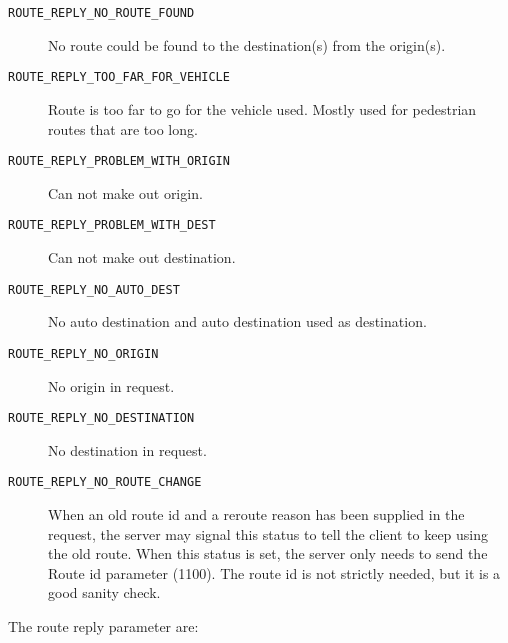 \documentclass[a4paper]{article}
\begin{document}
\begin{description}
   \item[{\tt ROUTE\_REPLY\_NO\_ROUTE\_FOUND}] No route could be found to the 
      destination(s) from the origin(s).
   \item[{\tt ROUTE\_REPLY\_TOO\_FAR\_FOR\_VEHICLE}] Route is too far to go
      for the vehicle used. Mostly used for pedestrian routes that are too 
      long.
  \item[{\tt ROUTE\_REPLY\_PROBLEM\_WITH\_ORIGIN}] Can not make out origin.
  \item[{\tt ROUTE\_REPLY\_PROBLEM\_WITH\_DEST}] Can not make out destination.
  \item[{\tt ROUTE\_REPLY\_NO\_AUTO\_DEST}] No auto destination and auto 
      destination used as destination.
  \item[{\tt ROUTE\_REPLY\_NO\_ORIGIN}] No origin in request.
  \item[{\tt ROUTE\_REPLY\_NO\_DESTINATION}] No destination in request.    
  \item[{\tt ROUTE\_REPLY\_NO\_ROUTE\_CHANGE}] When an old route id and
    a reroute reason has been supplied in the request, the server may
    signal this status to tell the client to keep using the old route.
    When this status is set, the server only needs to send the Route
    id parameter (1100). The route id is not strictly needed, but it
    is a good sanity check.
\end{description}

The route reply parameter are:
\end{document}

